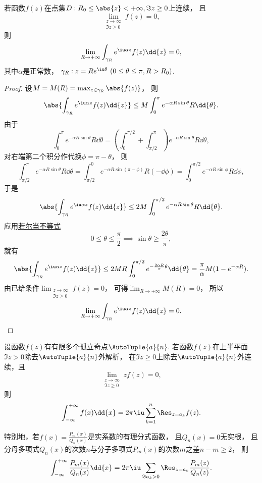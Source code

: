 \begin{lemma}[若尔当引理]\label{theorem:留数定理.计算积分路径上没有奇点的无穷限积分.引理2}
若函数\(f(z)\)在点集\(D: R_0 \leq \abs{z} < +\infty, \Im z \geq 0\)上连续，
且\[
	\lim_{\substack{z\to\infty \\ \Im z \geq 0}} f(z) = 0,
\]
则\begin{equation}
	\lim_{R\to+\infty} \int_{\gamma_R} e^{\iu\alpha z} f(z) \dd{z} = 0,
\end{equation}
其中\(\alpha\)是正常数，
\(\gamma_R: z = R e^{\iu\theta}\ (0\leq\theta\leq\pi, R>R_0)\).
\begin{proof}
设\(M = M(R) = \max_{z \in \gamma_R} \abs{f(z)}\)，
则\[
	\abs{ \int_{\gamma_R} e^{\iu\alpha z} f(z) \dd{z} }
	\leq M \int_0^\pi e^{-\alpha R \sin\theta} R \dd{\theta}.
\]
由于\[
	\int_0^\pi e^{-\alpha R \sin\theta} R \dd{\theta}
	= \left(\int_0^{\pi/2} + \int_{\pi/2}^\pi\right)
	e^{-\alpha R \sin\theta} R \dd{\theta},
\]
对右端第二个积分作代换\(\phi=\pi-\theta\)，
则\[
	\int_{\pi/2}^\pi e^{-\alpha R \sin\theta} R \dd{\theta}
	= \int_{\pi/2}^0 e^{-\alpha R \sin(\pi-\phi)} R (-\dd{\phi})
	= \int_0^{\pi/2} e^{-\alpha R \sin\phi} R \dd{\phi},
\]
于是\[
	\abs{ \int_{\gamma_R} e^{\iu\alpha z} f(z) \dd{z} }
	\leq 2M \int_0^{\pi/2} e^{-\alpha R \sin\theta} R \dd{\theta}.
\]
应用\hyperref[equation:微分中值定理.若尔当不等式]{若尔当不等式}\[
	0\leq\theta\leq\frac{\pi}{2}
	\implies
	\sin\theta\geq\frac{2\theta}{\pi},
\]
就有\[
	\abs{ \int_{\gamma_R} e^{\iu\alpha z} f(z) \dd{z} }
	\leq 2MR \int_0^{\pi/2} e^{-\frac{2\alpha R}{\pi}\theta} \dd{\theta}
	= \frac{\pi}{\alpha} M (1-e^{-\alpha R}).
\]
由已给条件\(\lim_{\substack{z\to\infty \\ \Im z \geq 0}} f(z) = 0\)，
可得\(\lim_{R\to+\infty} M(R) = 0\)，
所以\[
	\lim_{R\to+\infty} \int_{\gamma_R} e^{\iu\alpha z} f(z) \dd{z} = 0.
	\qedhere
\]
\end{proof}
\end{lemma}

\begin{theorem}\label{theorem:留数定理.利用留数定理计算实积分2}
设函数\(f(z)\)有有限多个孤立奇点\(\AutoTuple{a}{n}\).
若函数\(f(z)\)在上半平面\(\Im z > 0\)除去\(\AutoTuple{a}{n}\)外解析，
在\(\Im z \geq 0\)上除去\(\AutoTuple{a}{n}\)外连续，且\[
	\lim_{\substack{z\to\infty \\ \Im z \geq 0}} z f(z) = 0,
\]
则\begin{equation}
	\int_{-\infty}^{+\infty} f(x) \dd{x}
	= 2\pi\iu \sum_{k=1}^n \Res_{z=a_k} f(z).
\end{equation}

特别地，若\(f(x) = \frac{P_m(x)}{Q_n(x)}\)是实系数的有理分式函数，
且\(Q_n(x) = 0\)无实根，
且分母多项式\(Q_n(x)\)的次数\(n\)与分子多项式\(P_m(x)\)的次数\(m\)之差\(n-m\geq2\)，
则\begin{equation}
	\int_{-\infty}^{+\infty} \frac{P_m(x)}{Q_n(x)} \dd{x}
	= 2\pi\iu \sum_{\Im a_k > 0} \Res_{z=a_k} \frac{P_m(z)}{Q_n(z)}.
\end{equation}
\end{theorem}

